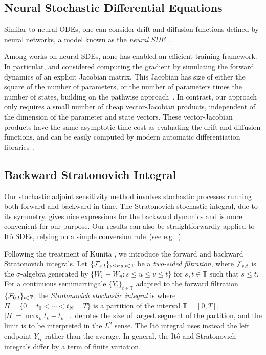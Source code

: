 \documentclass[twoside]{article}
\begin{document}
\subsection{Neural Stochastic Differential Equations}
\label{subsec:bg_neural_sde}
Similar to neural ODEs, one can consider drift and diffusion functions defined by neural networks, a model known as the \textit{neural SDE}~\citep{tzen2019neural,tzen2019theoretical,liu2019neural,jia2019}.

Among works on neural SDEs, none has enabled an efficient training framework.
In particular, \citet{tzen2019neural} and \citet{liu2019neural} considered computing the gradient by simulating the forward dynamics of an explicit Jacobian matrix.
This Jacobian has size of either the square of the number of parameters, or the number of parameters times the number of states, building on the pathwise approach~\cite{gobet2005sensitivity,yang1991monte}.
In contrast, our approach only requires a small number of cheap vector-Jacobian products, independent of the dimension of the parameter and state vectors.
These vector-Jacobian products have the same asymptotic time cost as evaluating the drift and diffusion functions, and can be easily computed by modern automatic differentiation libraries~\citep{maclaurin2015autograd,paszke2017automatic,abadi2016tensorflow,frostig2018compiling}. 

\subsection{Backward Stratonovich Integral}
\label{subsec:bg_backward_stratonovich_integral}
Our stochastic adjoint sensitivity method involves stochastic processes running both forward and backward in time. The Stratonovich stochastic integral, due to its symmetry, gives nice expressions for the backward dynamics and is more convenient for our purpose.
Our results can also be straightforwardly applied to It\^o SDEs, relying on a simple conversion rule~(see e.g.~\cite[Sec. 2]{platen1999introduction}).

Following the treatment of Kunita \cite{kunita2019stochastic}, we introduce the forward and backward Stratonovich integrals. Let $\{ \mathcal{F}_{s, t}\}_{s \le t; s,t \in \mathbb{T}}$ be a \emph{two-sided filtration}, where $\mathcal{F}_{s, t}$ is the $\sigma$-algebra generated by $\{W_v - W_u: s \le u \le v \le t\}$ for $s, t \in \mathbb{T}$ such that $s \le t$. For a continuous semimartingale $\{ Y_t \}_{t\in \mathbb{T}}$ adapted to the forward filtration $\{\mathcal{F}_{0, t}\}_{t \in \mathbb{T}}$, the \emph{Stratonovich stochastic integral} is
where $\Pi = \{0 = t_0 < \cdots < t_N = T \}$ is a partition of the interval $\mathbb{T} = [0, T]$, $|\Pi| = \max_k t_{k} - t_{k-1}$ denotes the size of largest segment of the partition, and the limit is to be interpreted in the $L^2$ sense. The It\^{o} integral uses instead the left endpoint $Y_{t_k}$ rather than the average. In general, the It\^{o} and Stratonovich integrals differ by a term of finite variation.
\end{document}
